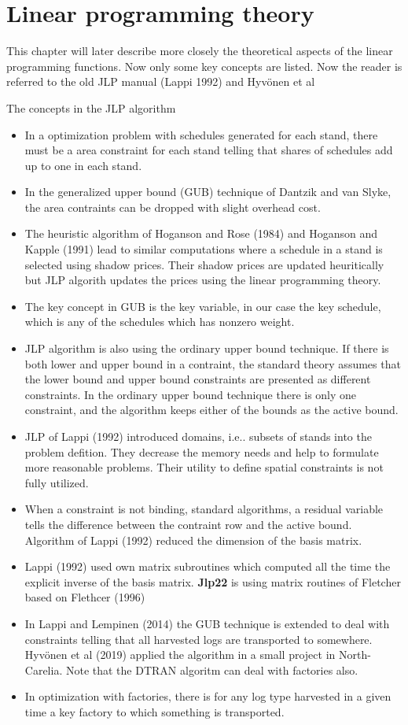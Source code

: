 \section{Linear programming theory}
\label{LP}
This chapter will later describe more closely the theoretical aspects of the linear programming
functions. Now only some key concepts are listed. Now the reader is referred to the old
JLP manual (Lappi 1992) and Hyv\"onen et al

The concepts in the JLP algorithm


\begin{itemize}
\item In a optimization problem with schedules generated for each stand, there must be a area
constraint for each stand telling that shares of schedules add up to one in each stand.
\item In the generalized upper bound (GUB) technique of Dantzik and van Slyke, the area contraints can
be dropped with slight overhead cost.
\item The heuristic algorithm of Hoganson and Rose (1984) and
Hoganson and Kapple (1991) lead to similar computations where a schedule
in  a stand is selected using shadow prices. Their shadow prices are updated heuritically but
JLP algorith updates the prices using the linear programming theory.
\item The key concept in GUB is the key variable, in our case the key schedule, which is
any of the schedules which has nonzero weight.
\item JLP algorithm is also using the ordinary upper bound technique. If there is both
lower and upper bound in a contraint, the standard theory assumes that the lower bound and upper bound
constraints are presented  as different constraints. In the ordinary upper bound technique there
is only one constraint, and the algorithm keeps either of the bounds as the active bound.
\item JLP of Lappi (1992) introduced domains, i.e.. subsets of stands into the problem
defition. They decrease the memory needs and help to formulate more reasonable problems.
Their utility to define spatial constraints is not fully utilized.
\item When a constraint is not binding, standard algorithms, a residual variable tells
the difference between the contraint row and the active bound. Algorithm of Lappi (1992)
reduced the dimension of the basis matrix.
\item Lappi (1992) used own matrix subroutines which computed all the time the explicit inverse
of the basis matrix. \textbf{Jlp22} is using matrix routines of Fletcher based on Flethcer (1996)
\item In Lappi and Lempinen (2014) the GUB technique is extended to deal with
constraints telling that all harvested logs are transported to somewhere. Hyv\"onen et
al (2019) applied the algorithm in a small project in North-Carelia. Note that the DTRAN algoritm can deal with
factories also.
\item In optimization with factories, there is for any log type harvested in a given time a
key factory to which something is transported.
\end{itemize}
